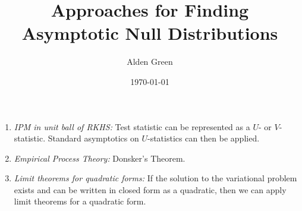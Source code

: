 \documentclass{article}
\newcommand{\1}{\mathbf{1}}
\theoremstyle{alden}
\theoremstyle{aldenthm}
\theoremstyle{remark}
\begin{document}
	
\title{Approaches for Finding Asymptotic Null Distributions}
\author{Alden Green}
\date{\today}
\maketitle

\begin{enumerate}
	\item \textit{IPM in unit ball of RKHS:} Test statistic can be represented as a $U$- or $V$-statistic. Standard asymptotics on $U$-statistics can then be applied.
	\item \textit{Empirical Process Theory:} Donsker's Theorem.
	\item \textit{Limit theorems for quadratic forms:} If the solution to the variational problem exists and can be written in closed form as a quadratic, then we can apply limit theorems for a quadratic form.
\end{enumerate}
\end{document}
